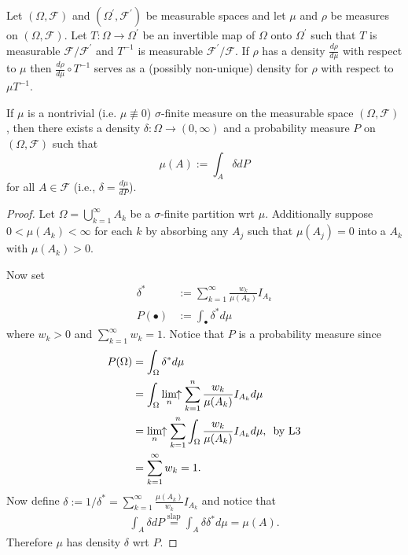 \begin{theorem} Let $(\Omega, \mathcal F)$ and $(\Omega^\prime, \mathcal F^\prime)$  be measurable spaces and let $\mu$ and $\rho$ be  measures on $(\Omega, \mathcal F)$. Let $T:\Omega \rightarrow \Omega^\prime$ be an invertible map of $\Omega$ onto $\Omega^\prime$ such that $T$ is measurable $\mathcal F/\mathcal F^\prime$  and $T^{-1}$ is measurable $\mathcal F^\prime/\mathcal F$. If $\rho$ has a density $\frac{d\rho}{d\mu}$ with respect to $\mu$ then $ \frac{d\rho}{d\mu}\circ T^{-1}$ serves as a (possibly non-unique) density for $\rho$  with respect to $\mu T^{-1}$.
\end{theorem}






\begin{theorem}
\label{thm: world view}
If $\mu$ is a nontrivial (i.e. $\mu\not\equiv 0$) $\sigma$-finite measure on the measurable space $(\Omega, \mathcal F)$, then there exists a density $\delta:\Omega\rightarrow (0,\infty)$ and a probability measure $P$ on $(\Omega, \mathcal F)$ such that
\[ \mu(A):= \int_A \delta dP \]
for all $A\in\mathcal F$ (i.e.,  $\delta =\frac{d\mu}{dP}$).
\end{theorem}

\begin{proof}
Let $\Omega=\bigcup_{k=1}^\infty A_k$ be a $\sigma$-finite partition wrt $\mu$. Additionally suppose $0<\mu(A_k)<\infty$ for each $k$ by absorbing any $A_j$ such that $\mu(A_j)=0$ into a $A_k$ with $\mu(A_k)>0$.


Now set
\begin{align*}
\delta^*   &:= \sum_{k=1}^\infty \frac{w_k}{\mu(A_k) }I_{A_k} \\
P(\bullet) &:=\int_\bullet \delta^* d\mu
\end{align*}
where $w_k>0$ and $\sum_{k=1}^\infty w_k = 1$. Notice that $P$ is a probability measure since
\begin{align*}
P(\Omega) & = \int_\Omega \delta^* d\mu \\
& = \int_\Omega \displaystyle\lim_{n}\!\!\uparrow\sum_{k=1}^n\frac{w_k}{\mu(A_k) }I_{A_k}d\mu \\
& = \displaystyle\lim_{n}\!\!\uparrow\sum_{k=1}^n \int_\Omega \frac{w_k}{\mu(A_k) }I_{A_k} d\mu,\,\text{ by L3}\\
& = \sum_{k=1}^\infty w_k = 1.
\end{align*}
Now define $\delta:=1/\delta^* = \sum_{k=1}^\infty \frac{\mu(A_k)}{w_k} I_{A_k}$ and notice that
\begin{align*}
\int_A \delta dP \overset{\text{slap}}= \int_A \delta \delta ^* d\mu = \mu(A).
\end{align*}
Therefore $\mu$ has density $\delta$ wrt $P$.
\end{proof}


